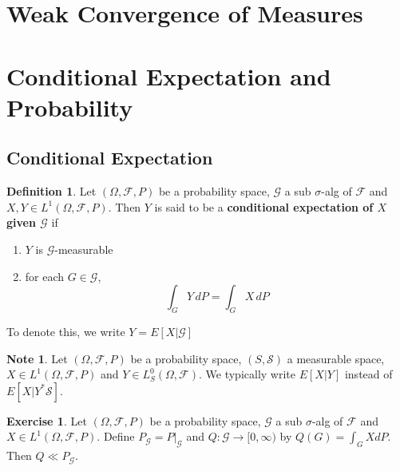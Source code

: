 \documentclass[12pt]{amsart}
\theoremstyle{definition}
\newtheorem{defn}[definition]{Definition}
\newtheorem{note}[definition]{Note}
\newtheorem{ex}[definition]{Exercise}
\newcommand{\sig}{\sigma}
\newcommand{\Om}{\Omega}
\newcommand{\MF}{\mathcal{F}}
\newcommand{\MG}{\mathcal{G}}
\newcommand{\MS}{\mathcal{S}}
\newcommand{\dP}{\, d P}
\begin{document}
	
	
	
	
	
	
	
	
	
	
	
	
	
	\newpage
	\section{Weak Convergence of Measures}
	
	
	
	
	
	
	
	
	
	
	
	
	
	
	
	
	
	
	
	
	\newpage
	\section{Conditional Expectation and Probability}
	
	\subsection{Conditional Expectation}
	
	\begin{defn} 
	Let $(\Om, \MF, P)$ be a probability space, $\MG$ a sub $\sig$-alg of $\MF$ and $X, Y \in L^1(\Om, \MF, P)$. Then $Y $ is said to be a \textbf{conditional expectation of $X$ given $\MG$} if 
	\begin{enumerate}
	\item $Y$ is $\MG$-measurable
	\item for each $G \in \MG$, 
	$$\int_G Y \dP = \int_G X \dP$$ 
	\end{enumerate}	 
	To denote this, we write $Y = E[X|\MG]$
	\end{defn}		
	
	\begin{note}
	Let $(\Om, \MF, P)$ be a probability space, $(S, \MS)$ a measurable space, $X \in L^1(\Om, \MF, P)$ and $Y \in L^0_S(\Om, \MF)$. We typically write $E[X|Y]$ instead of $E[X| Y^*\MS]$.
	\end{note}
	
	\begin{ex}
	Let $(\Om, \MF, P)$ be a probability space, $\MG$ a sub $\sig$-alg of $\MF$ and $X \in L^1(\Om, \MF, P)$. Define $P_{\MG} = P|_{\MG}$ and $Q: \MG \rightarrow [0,\infty)$ by $Q(G) = \int_G X d P $. Then $Q \ll P_{\MG}$. 
	\end{ex}	
	
\end{document}
